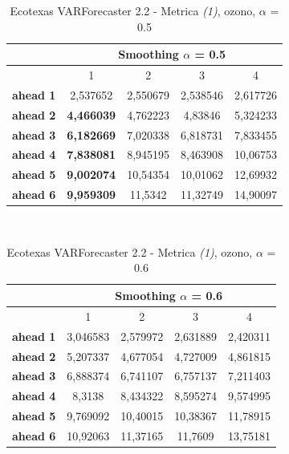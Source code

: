 \documentclass[12pt,a4paper,oneside,openright]{book}
\begin{document}
\medskip

\begin{table}[H]
\centering
\begin{tabular}{|c|c|c|c|c|}
\hline
 & \multicolumn{4}{|c|}{Smoothing $\alpha$ = 0.5} \\
\hline
& 1 & 2 & 3 & 4 \\
\hline
\textbf{ahead 1} & 2,537652 & 2,550679 & 2,538546 & 2,617726\\
\hline
\textbf{ahead 2} & \textbf{4,466039} & 4,762223 & 4,83846 & 5,324233\\ 
\hline
\textbf{ahead 3} & \textbf{6,182669} & 7,020338 & 6,818731 & 7,833455\\
\hline
\textbf{ahead 4} & \textbf{7,838081} & 8,945195 & 8,463908 & 10,06753\\ 
\hline
\textbf{ahead 5} & \textbf{9,002074} & 10,54354 & 10,01062 & 12,69932\\
\hline
\textbf{ahead 6} & \textbf{9,959309} & 11,5342 & 11,32749 & 14,90097\\ 
\hline
\end{tabular} \\
\caption{Ecotexas VARForecaster 2.2 - Metrica \textit{(1)}, ozono, $\alpha$ = 0.5}
\end{table} 

\medskip

\begin{table}[H]
\centering
\begin{tabular}{|c|c|c|c|c|}
\hline
 & \multicolumn{4}{|c|}{Smoothing $\alpha$ = 0.6} \\
\hline
& 1 & 2 & 3 & 4 \\
\hline
\textbf{ahead 1} & 3,046583 & 2,579972 & 2,631889 & 2,420311\\
\hline
\textbf{ahead 2} & 5,207337 & 4,677054 & 4,727009 & 4,861815\\ 
\hline
\textbf{ahead 3} & 6,888374 & 6,741107 & 6,757137 & 7,211403\\
\hline
\textbf{ahead 4} & 8,3138 & 8,434322 & 8,595274 & 9,574995\\ 
\hline
\textbf{ahead 5} & 9,769092 & 10,40015 & 10,38367 & 11,78915\\
\hline
\textbf{ahead 6} & 10,92063 & 11,37165 & 11,7609 & 13,75181\\ 
\hline
\end{tabular} \\
\caption{Ecotexas VARForecaster 2.2 - Metrica \textit{(1)}, ozono, $\alpha$ = 0.6}
\end{table} 
\end{document}
